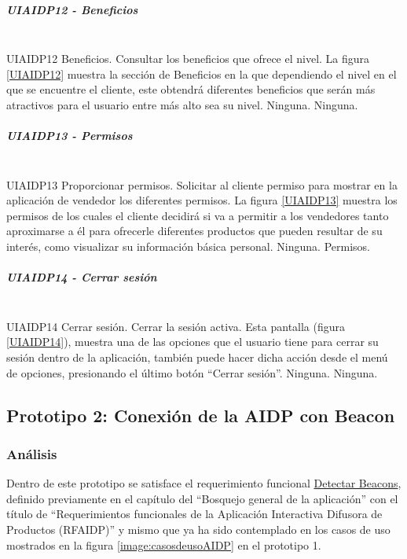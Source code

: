 \subparagraph{UIAIDP12 - Beneficios} ~\\
\FloatBarrier
{} %
{UIAIDP12} %
{Beneficios.}  %
{Consultar los beneficios que ofrece el nivel.} %
{La figura \ref{UIAIDP12} muestra la sección de Beneficios en la que dependiendo el nivel en el que se encuentre el cliente, este obtendrá diferentes beneficios que serán más atractivos para el usuario entre más alto sea su nivel.} %
{Ninguna.} %
{Ninguna.} %
\FloatBarrier

\subparagraph{UIAIDP13 - Permisos} ~\\
\FloatBarrier
{} %
{UIAIDP13} %
{Proporcionar permisos.}  %
{Solicitar al cliente permiso para mostrar en la aplicación de vendedor los diferentes permisos.} %
{La figura \ref{UIAIDP13} muestra los permisos de los cuales el cliente decidirá si va a permitir a los vendedores tanto aproximarse a él para ofrecerle diferentes productos que pueden resultar de su interés, como visualizar su información básica personal.} %
{Ninguna.} %
{Permisos.} %
\FloatBarrier

\subparagraph{UIAIDP14 - Cerrar sesión} ~\\
\FloatBarrier
{} %
{UIAIDP14} %
{Cerrar sesión.}  %
{Cerrar la sesión activa.} %
{Esta pantalla (figura \ref{UIAIDP14}), muestra una de las opciones que el usuario tiene para cerrar su sesión dentro de la aplicación, también puede hacer dicha acción desde el menú de opciones, presionando el último botón ``Cerrar sesión''.} %
{Ninguna.} %
{Ninguna.} %
\FloatBarrier

\subsection{Prototipo 2: Conexión de la AIDP con Beacon}
\subsubsection{Análisis}
Dentro de este prototipo se satisface el requerimiento funcional \hyperlink{RFAIDP}{Detectar Beacons}, definido previamente en el capítulo del ``Bosquejo general de la aplicación''  con el título de ``Requerimientos funcionales de la Aplicación Interactiva Difusora de Productos (RFAIDP)'' y mismo que ya ha sido contemplado en los casos de uso mostrados en la figura \ref{image:casosdeusoAIDP} en el prototipo 1. \\ \par
